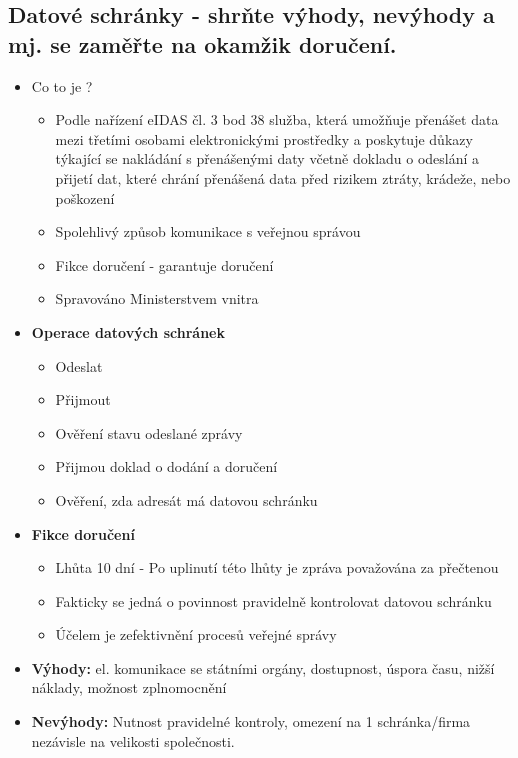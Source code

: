 \subsection{Datové schránky - shrňte výhody, nevýhody a mj. se zaměřte na okamžik doručení.}
\begin{itemize}
\item Co to je ?
    \begin{itemize}
        \item Podle nařízení eIDAS čl. 3 bod 38 služba, která umožňuje přenášet data mezi třetími osobami elektronickými prostředky a poskytuje důkazy týkající se nakládání s přenášenými daty včetně dokladu o odeslání a přijetí dat, které chrání přenášená data před rizikem ztráty, krádeže, nebo poškození
        \item Spolehlivý způsob komunikace s veřejnou správou 
        \item Fikce doručení - garantuje doručení
        \item Spravováno Ministerstvem vnitra
    \end{itemize}
\item\textbf{Operace datových schránek}
    \begin{itemize}
        \item Odeslat
        \item Přijmout
        \item Ověření stavu odeslané zprávy
        \item Přijmou doklad o dodání a doručení
        \item Ověření, zda adresát má datovou schránku
    \end{itemize}
\item\textbf{Fikce doručení}
    \begin{itemize}
        \item Lhůta 10 dní - Po uplinutí této lhůty je zpráva považována za přečtenou
        \item Fakticky se jedná o povinnost pravidelně kontrolovat datovou schránku
        \item Účelem je zefektivnění procesů veřejné správy
    \end{itemize}
\item \textbf{Výhody:} el. komunikace se státními orgány, dostupnost, úspora času, nižší náklady, možnost zplnomocnění
\item \textbf{Nevýhody:} Nutnost pravidelné kontroly, omezení na 1 schránka/firma nezávisle na velikosti společnosti.
\end{itemize}


